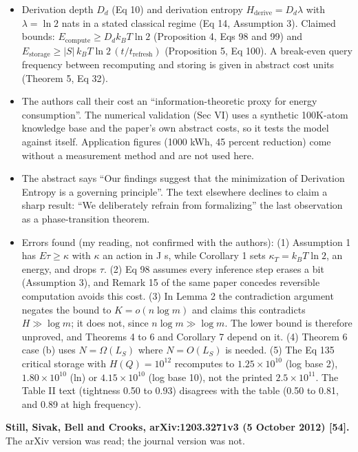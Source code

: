 \documentclass[
  10pt,
]{article}
\providecommand{\tightlist}{%
  \setlength{\itemsep}{0pt}\setlength{\parskip}{0pt}}
\begin{document}
\begin{itemize}
\tightlist
\item
  Derivation depth \(D_d\) (Eq 10) and derivation entropy
  \(H_{\mathrm{derive}} = D_d\lambda\) with \(\lambda = \ln 2\) nats in
  a stated classical regime (Eq 14, Assumption 3). Claimed bounds:
  \(E_{\mathrm{compute}} \ge D_d k_B T\ln 2\) (Proposition 4, Eqs 98 and
  99) and
  \(E_{\mathrm{storage}} \ge |S|\,k_B T\ln 2\,(t/t_{\mathrm{refresh}})\)
  (Proposition 5, Eq 100). A break-even query frequency between
  recomputing and storing is given in abstract cost units (Theorem 5, Eq
  32).
\item
  The authors call their cost an ``information-theoretic proxy for
  energy consumption''. The numerical validation (Sec VI) uses a
  synthetic 100K-atom knowledge base and the paper's own abstract costs,
  so it tests the model against itself. Application figures (1000 kWh,
  45 percent reduction) come without a measurement method and are not
  used here.
\item
  The abstract says ``Our findings suggest that the minimization of
  Derivation Entropy is a governing principle''. The text elsewhere
  declines to claim a sharp result: ``We deliberately refrain from
  formalizing'' the last observation as a phase-transition theorem.
\item
  Errors found (my reading, not confirmed with the authors): (1)
  Assumption 1 has \(E\tau \ge \kappa\) with \(\kappa\) an action in J
  s, while Corollary 1 sets \(\kappa_T = k_B T\ln 2\), an energy, and
  drops \(\tau\). (2) Eq 98 assumes every inference step erases a bit
  (Assumption 3), and Remark 15 of the same paper concedes reversible
  computation avoids this cost. (3) In Lemma 2 the contradiction
  argument negates the bound to \(K = o(n\log m)\) and claims this
  contradicts \(H \gg \log m\); it does not, since
  \(n\log m \gg \log m\). The lower bound is therefore unproved, and
  Theorems 4 to 6 and Corollary 7 depend on it. (4) Theorem 6 case (b)
  uses \(N = \Omega(L_S)\) where \(N = O(L_S)\) is needed. (5) The Eq
  135 critical storage with \(H(Q) = 10^{12}\) recomputes to
  \(1.25\times10^{10}\) (log base 2), \(1.80\times10^{10}\) (ln) or
  \(4.15\times10^{10}\) (log base 10), not the printed
  \(2.5\times10^{11}\). The Table II text (tightness 0.50 to 0.93)
  disagrees with the table (0.50 to 0.81, and 0.89 at high frequency).
\end{itemize}

\textbf{Still, Sivak, Bell and Crooks, arXiv:1203.3271v3 (5 October
2012) {[}54{]}.} The arXiv version was read; the journal version was
not.
\end{document}
